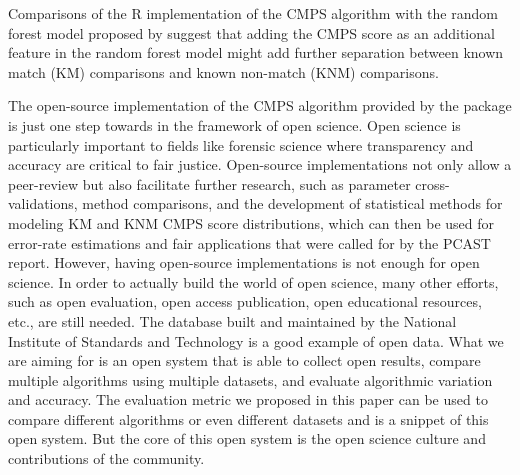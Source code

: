 Comparisons of the R implementation of the CMPS algorithm with the
random forest model proposed by \citet{aoas} suggest that adding the
CMPS score as an additional feature in the random forest model might add
further separation between known match (KM) comparisons and known
non-match (KNM) comparisons.

The open-source implementation of the CMPS algorithm provided by the
 package is just one step towards in the framework of open
science. Open science is particularly important to fields like forensic
science where transparency and accuracy are critical to fair justice.
Open-source implementations not only allow a peer-review but also
facilitate further research, such as parameter cross-validations, method
comparisons, and the development of statistical methods for modeling KM
and KNM CMPS score distributions, which can then be used for error-rate
estimations and fair applications that were called for by the PCAST
\citep{pcast} report. However, having open-source implementations is not
enough for open science. In order to actually build the world of open
science, many other efforts, such as open evaluation, open access
publication, open educational resources, etc., are still needed. The
database built and maintained by the National Institute of Standards and
Technology is a good example of open data. What we are aiming for is an
open system that is able to collect open results, compare multiple
algorithms using multiple datasets, and evaluate algorithmic variation
and accuracy. The evaluation metric we proposed in this paper can be
used to compare different algorithms or even different datasets and is a
snippet of this open system. But the core of this open system is the
open science culture and contributions of the community.



\address{%
Wangqian W. Ju\\
Department of Statistics\\%
Center for Statistics and Applications in Forensic Evidence\\ Iowa State
University\\ 2438 Osborn Dr\\ Ames, IA 50011\\
%
\url{https://github.com/willju-wangqian}%
\\\textit{ORCiD: \href{https://orcid.org/0000-0002-9977-377X}{0000-0002-9977-377X}}%
\\\href{mailto:wju@iastate.edu}{\nolinkurl{wju@iastate.edu}}
}

\address{%
Heike Hofmann\\
Department of Statistics\\%
Center for Statistics and Applications in Forensic Evidence\\ Iowa State
University\\ 2438 Osborn Dr\\ Ames, IA 50011\\
%
\url{https://github.com/heike}%
\\\textit{ORCiD: \href{https://orcid.org/0000-0002-9079-593X}{0000-0002-9079-593X}}%
\\\href{mailto:hofmann@iastate.edu}{\nolinkurl{hofmann@iastate.edu}}
}
